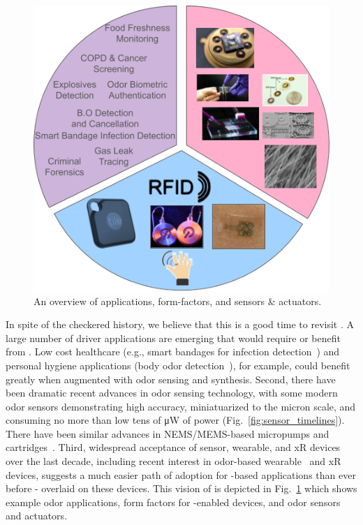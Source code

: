 \begin{figure}
    \centering
    \includegraphics[width=0.7\linewidth]{./figs/odor_vision.png}
    \caption{\small
        An overview of \olfc{} applications,
        form-factors, and sensors \& actuators.
    }
    \label{fig:vision}
\end{figure}

In spite of the checkered history, we believe that this is a good time to
revisit \olfc{}. A large number of driver applications are emerging that would
require or benefit from \olfc{}. Low cost healthcare (e.g., smart bandages for
infection detection~\cite{derakhshandeh2018smart})  and personal hygiene
applications (body odor detection~\cite{wongchoosuk2009detection, jha2015quick,
jha2016gc, jha2015human}), for example, could benefit greatly when augmented
with odor sensing and synthesis. Second, there have been dramatic recent
advances in odor sensing technology, with some modern odor sensors
demonstrating high accuracy, miniatuarized to the micron scale, and consuming no
more than low tens of \si{\micro\watt} of power
(Fig.~\ref{fig:sensor_timelines}).  There have been similar advances in
NEMS/MEMS-based micropumps and cartridges~\cite{tillotson2006scent}.  Third,
widespread acceptance of sensor, wearable, and xR devices over the last decade,
including recent interest in odor-based wearable~\cite{olorama_technology,
tillotson2006scent, amores2017essence, anthrotronix_2019, peters_2019,
amores2018promoting, bahremand2022smell} and xR~\cite{stewart_2022} devices,
suggests a much easier path of adoption for \olfc{}-based applications than
ever before - overlaid on these devices. This vision of \olfc{} is
depicted in Fig.~\ref{fig:vision} which shows example odor applications, form
factors for \olfc{}-enabled devices, and odor sensors and actuators.



